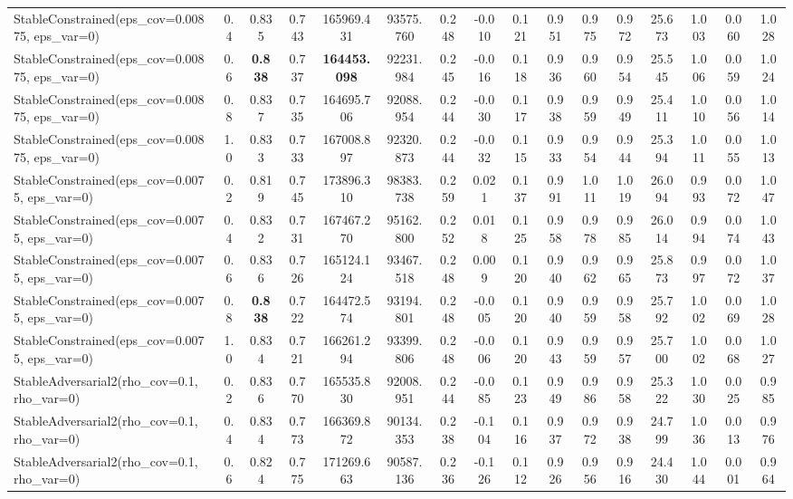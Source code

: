 \documentclass[11pt]{article}
\theoremstyle{plain}
\theoremstyle{definition}
\newcommand{\1}{\mathbf{1}}
\begin{document}
\begin{table}[h]
{\begin{tabular}{lccccccccccccccc}
StableConstrained(eps\_cov=0.00875, eps\_var=0) & 0.4 & 0.835 & 0.743 & 165969.431 & 93575.760 & 0.248 & -0.010 & 0.121 & 0.951 & 0.975 & 0.972 & 25.673 & 1.003 & 0.060 & 1.028 \\
StableConstrained(eps\_cov=0.00875, eps\_var=0) & 0.6 & \textbf{0.838} & 0.737 & \textbf{164453.098} & 92231.984 & 0.245 & -0.016 & 0.118 & 0.936 & 0.960 & 0.954 & 25.545 & 1.006 & 0.059 & 1.024 \\
StableConstrained(eps\_cov=0.00875, eps\_var=0) & 0.8 & 0.837 & 0.735 & 164695.706 & 92088.954 & 0.244 & -0.030 & 0.117 & 0.938 & 0.959 & 0.949 & 25.411 & 1.010 & 0.056 & 1.014 \\
StableConstrained(eps\_cov=0.00875, eps\_var=0) & 1.0 & 0.833 & 0.733 & 167008.897 & 92320.873 & 0.244 & -0.032 & 0.115 & 0.933 & 0.954 & 0.944 & 25.394 & 1.011 & 0.055 & 1.013 \\
StableConstrained(eps\_cov=0.0075, eps\_var=0) & 0.2 & 0.819 & 0.745 & 173896.310 & 98383.738 & 0.259 & 0.021 & 0.137 & 0.991 & 1.011 & 1.019 & 26.094 & 0.993 & 0.072 & 1.047 \\
StableConstrained(eps\_cov=0.0075, eps\_var=0) & 0.4 & 0.832 & 0.731 & 167467.270 & 95162.800 & 0.252 & 0.018 & 0.125 & 0.958 & 0.978 & 0.985 & 26.014 & 0.994 & 0.074 & 1.043 \\
StableConstrained(eps\_cov=0.0075, eps\_var=0) & 0.6 & 0.836 & 0.726 & 165124.124 & 93467.518 & 0.248 & 0.009 & 0.120 & 0.940 & 0.962 & 0.965 & 25.873 & 0.997 & 0.072 & 1.037 \\
StableConstrained(eps\_cov=0.0075, eps\_var=0) & 0.8 & \textbf{0.838} & 0.722 & 164472.574 & 93194.801 & 0.248 & -0.005 & 0.120 & 0.940 & 0.959 & 0.958 & 25.792 & 1.002 & 0.069 & 1.028 \\
StableConstrained(eps\_cov=0.0075, eps\_var=0) & 1.0 & 0.834 & 0.721 & 166261.294 & 93399.806 & 0.248 & -0.006 & 0.120 & 0.943 & 0.959 & 0.957 & 25.700 & 1.002 & 0.068 & 1.027 \\
StableAdversarial2(rho\_cov=0.1, rho\_var=0) & 0.2 & 0.836 & 0.770 & 165535.830 & 92008.951 & 0.244 & -0.085 & 0.123 & 0.949 & 0.986 & 0.958 & 25.322 & 1.030 & 0.025 & 0.985 \\
StableAdversarial2(rho\_cov=0.1, rho\_var=0) & 0.4 & 0.834 & 0.773 & 166369.872 & 90134.353 & 0.238 & -0.104 & 0.116 & 0.937 & 0.972 & 0.938 & 24.799 & 1.036 & 0.013 & 0.976 \\
StableAdversarial2(rho\_cov=0.1, rho\_var=0) & 0.6 & 0.824 & 0.775 & 171269.663 & 90587.136 & 0.236 & -0.126 & 0.112 & 0.926 & 0.956 & 0.916 & 24.430 & 1.044 & 0.001 & 0.964 \\

\end{tabular}}
\end{table}
\end{document}
